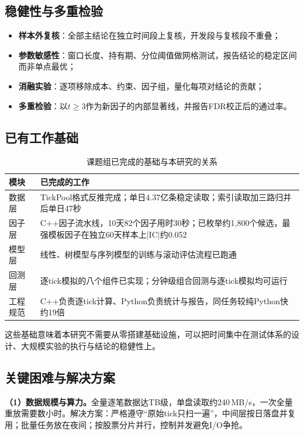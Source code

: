 \documentclass[11pt,a4paper]{article}
\begin{document}
\subsection*{稳健性与多重检验}

\begin{itemize}
  \item \textbf{样本外复核}：全部主结论在独立时间段上复核，开发段与复核段不重叠；
  \item \textbf{参数敏感性}：窗口长度、持有期、分位阈值做网格测试，报告结论的稳定区间而非单点最优；
  \item \textbf{消融实验}：逐项移除成本、约束、因子组，量化每项对结论的贡献；
  \item \textbf{多重检验}：以$t\ge3$作为新因子的内部显著线\citep{harvey2016}，并报告FDR校正后的通过率。
\end{itemize}

\subsection*{已有工作基础}

\begin{table}
  \caption{课题组已完成的基础与本研究的关系}
  \begin{tabular}{ll}
    \toprule
    模块 & 已完成的工作 \\
    \midrule
    数据层 & TickPool格式反推完成；单日4.37亿条稳定读取；索引读取加三路归并后单日47秒 \\
    因子层 & C++因子流水线，10天82个因子用时30秒；已枚举约1{,}800个候选，最强模板因子在独立60天样本上$|$IC$|$约0.052 \\
    模型层 & 线性、树模型与序列模型的训练与滚动评估流程已跑通 \\
    回测层 & 逐tick模拟的八个组件已实现；分钟级组合回测与逐tick模拟均可运行 \\
    工程规范 & C++负责逐tick计算、Python负责统计与报告，同任务较纯Python快约19倍 \\
    \bottomrule
  \end{tabular}
\end{table}

这些基础意味着本研究不需要从零搭建基础设施，可以把时间集中在测试体系的设计、大规模实验的执行与结论的稳健性上。

\subsection*{关键困难与解决方案}

\textbf{（1）数据规模与算力。}全量逐笔数据达TB级，单盘读取约240\,MB/s，一次全量重放需要数小时。解决方案：严格遵守``原始tick只扫一遍''，中间层按日落盘并复用；批量任务放在夜间；按股票分片并行，控制并发避免I/O争抢。
\end{document}
